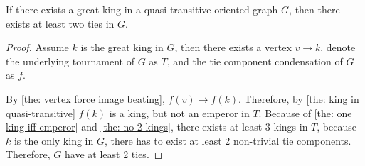 \begin{corollary}
  If there exists a great king in a
  quasi-transitive oriented graph \(G\),
  then there exists at least two ties in \(G\).
\end{corollary}

\begin{proof}
  Assume \(k\) is the great king in \(G\),
  then there exists a vertex \(v \to k\).
  denote the underlying tournament of \(G\) as \(T\),
  and the tie component condensation of \(G\) as \(f\).

  By \cref{the: vertex force image beating}, \(f(v) \to f(k)\).
  Therefore, by \cref{the: king in quasi-transitive}
  \(f(k)\) is a king, but not an emperor in \(T\).
  Because of \cref{the: one king iff emperor} and
  \cref{the: no 2 kings},
  there exists at least 3 kings in \(T\),
  because \(k\) is the only king in \(G\),
  there has to exist at least 2 non-trivial tie components.
  Therefore, \(G\) have at least 2 ties.
\end{proof}

